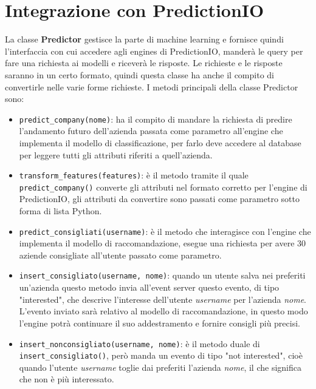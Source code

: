 \section{Integrazione con PredictionIO}
La classe \textbf{Predictor} gestisce la parte di machine learning e fornisce quindi l'interfaccia con cui accedere agli engines di PredictionIO, manderà le query per fare una richiesta ai modelli e riceverà le risposte. Le richieste e le risposte saranno in un certo formato, quindi questa classe ha anche il compito di convertirle nelle varie forme richieste. I metodi principali della classe Predictor sono:
\begin{itemize}
\item \verb+predict_company(nome)+: ha il compito di mandare la richiesta di predire l'andamento futuro dell'azienda passata come parametro all'engine che implementa il modello di classificazione, per farlo deve accedere al database per leggere tutti gli attributi riferiti a quell'azienda.
\item \verb+transform_features(features)+: è il metodo tramite il quale \\ \verb+predict_company()+ converte gli attributi nel formato corretto per l'engine di PredictionIO, gli attributi da convertire sono passati come parametro sotto forma di lista Python. 
\item \verb+predict_consigliati(username)+: è il metodo che interagisce con l'engine che implementa il modello di raccomandazione, esegue una richiesta per avere 30 aziende consigliate all'utente passato come parametro.
\item \verb+insert_consigliato(username, nome)+: quando un utente salva nei preferiti un'azienda questo metodo invia all'event server questo evento, di tipo "interested", che descrive l'interesse dell'utente \textit{username} per l'azienda \textit{nome}. L'evento inviato sarà relativo al modello di raccomandazione, in questo modo l'engine potrà continuare il suo addestramento e fornire consigli più precisi.
\item \verb+insert_nonconsigliato(username, nome)+: è il metodo duale di \\ \verb+insert_consigliato()+, però manda un evento di tipo "not interested", cioè quando l'utente \textit{username} toglie dai preferiti l'azienda \textit{nome}, il che significa che non è più interessato.
\end{itemize}

